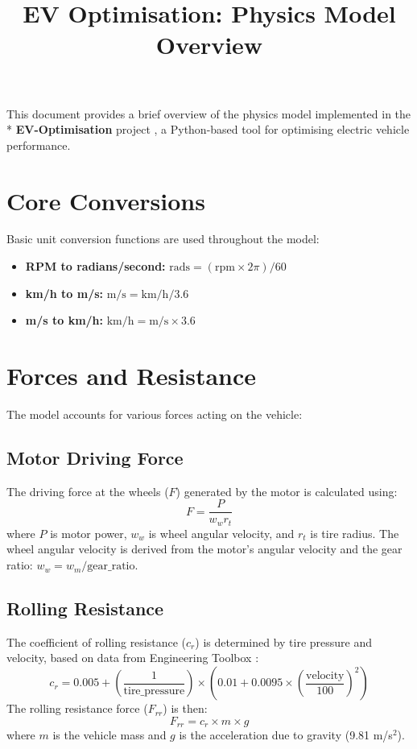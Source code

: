 \documentclass{article}
\title{EV Optimisation: Physics Model Overview}
\date{}
\begin{document}
\maketitle

This document provides a brief overview of the physics model implemented in the \\* \textbf{EV-Optimisation} project \cite{EVOptimisationRepo}, a Python-based tool for optimising electric vehicle performance.

\section{Core Conversions}

Basic unit conversion functions are used throughout the model:
\begin{itemize}
    \item \textbf{RPM to radians/second:}
    $\text{rads} = (\text{rpm} \times 2\pi) / 60$
    \item \textbf{km/h to m/s:}
    $\text{m/s} = \text{km/h} / 3.6$
    \item \textbf{m/s to km/h:}
    $\text{km/h} = \text{m/s} \times 3.6$
\end{itemize}

\section{Forces and Resistance}

The model accounts for various forces acting on the vehicle:

\subsection{Motor Driving Force}
The driving force at the wheels ($F$) generated by the motor is calculated using:
$$F = \frac{P}{w_w r_t}$$
where $P$ is motor power, $w_w$ is wheel angular velocity, and $r_t$ is tire radius. The wheel angular velocity is derived from the motor's angular velocity and the gear ratio: $w_w = w_m / \text{gear\_ratio}$.

\subsection{Rolling Resistance}
The coefficient of rolling resistance ($c_r$) is determined by tire pressure and velocity, based on data from Engineering Toolbox \cite{EngToolboxRollingResistance}:
$$c_r = 0.005 + \left(\frac{1}{\text{tire\_pressure}}\right) \times \left(0.01 + 0.0095 \times \left(\frac{\text{velocity}}{100}\right)^2\right)$$
The rolling resistance force ($F_{rr}$) is then:
$$F_{rr} = c_r \times m \times g$$
where $m$ is the vehicle mass and $g$ is the acceleration due to gravity (9.81 m/s$^2$).
\end{document}

